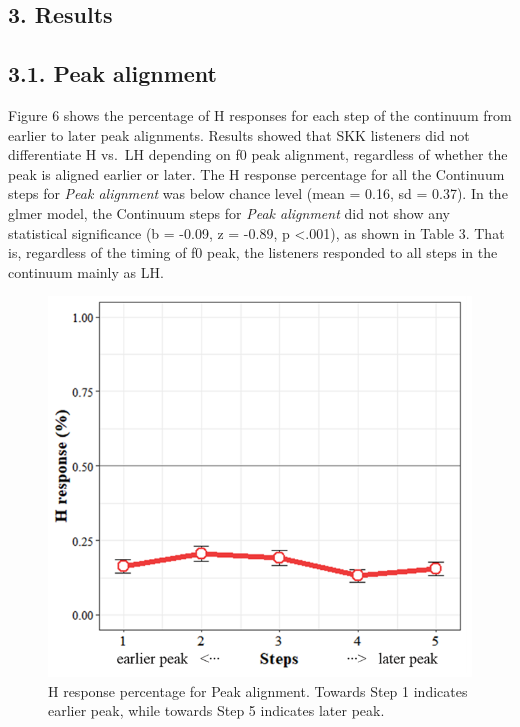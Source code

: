 \documentclass[
  man,floatsintext]{apa6}
\begin{document}
\hypertarget{results}{%
\subsection{3. Results}\label{results}}

\hypertarget{peak-alignment}{%
\subsection{3.1. Peak alignment}\label{peak-alignment}}

Figure 6 shows the percentage of H responses for each step of the continuum from earlier to later peak alignments. Results showed that SKK listeners did not differentiate H vs.~LH depending on f0 peak alignment, regardless of whether the peak is aligned earlier or later. The H response percentage for all the Continuum steps for \emph{Peak alignment} was below chance level (mean = 0.16, sd = 0.37). In the glmer model, the Continuum steps for \emph{Peak alignment} did not show any statistical significance (b = -0.09, z = -0.89, p \textless.001), as shown in Table 3. That is, regardless of the timing of f0 peak, the listeners responded to all steps in the continuum mainly as LH.
\newpage

\begin{figure}[H]

{\centering \includegraphics[width=1\linewidth]{images/picture6} 

}

\caption{H response percentage for Peak alignment. Towards Step 1 indicates earlier peak, while towards Step 5 indicates later peak.}\label{fig:picture6}
\end{figure}
\end{document}
